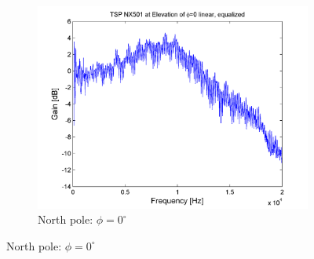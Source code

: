 \begin{figure}[t!]
        \begin{subfigure}[t]{0.5\textwidth}
			    \caption{North pole: $\phi=0^\circ$}
			    \label{fig:res_NX501_pluis_0}
                \centering
    			\includegraphics[height=0.28\textheight]{afbeeldingen/plots/results/NX501_north.png}
        \end{subfigure}
        

\end{figure}
